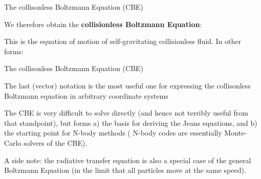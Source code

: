 \documentclass[letterpaper,landscape]{slides}
\begin{document}
\begin{slide}
\begin{center}
{\large \color{red} 
                    The collisonless Boltzmann Equation  (CBE)    }
\end{center}

We therefore obtain the {\bf collisionless Boltzmann Equation}:


This is the equation of motion of self-gravitating collisionless fluid. In other forms:




\vfill
\end{slide}


\begin{slide}
\begin{center}
{\large \color{red} 
                    The collisonless Boltzmann Equation  (CBE)    }
\end{center}


The last (vector) notation is the most useful one for expressing
the collisonless Boltzmann equation in arbitrary coordinate systems

The CBE is very difficult to solve directly (and hence not terribly useful
from that standpoint), but forms a) the basis for deriving {\color{blue} the
Jeans equations}, and b) the starting point for N-body methods
({\color{blue} N-body codes are essentially Monte-Carlo solvers of the
CBE}).

A side note: the radiative transfer equation is also a special case
of the general Boltzmann Equation (in the limit that all particles
move at the same speed). 


\vfill
\end{slide}
\end{document}
